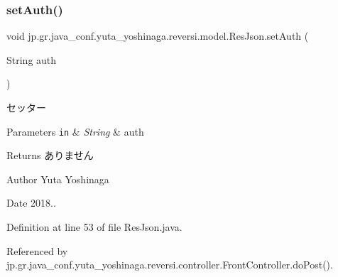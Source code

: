 \mbox{\label{classjp_1_1gr_1_1java__conf_1_1yuta__yoshinaga_1_1reversi_1_1model_1_1_res_json_aec94a5246bf7245af19f8f72100e986c}} 
\subsubsection{\texorpdfstring{set\+Auth()}{setAuth()}}
{\footnotesize\ttfamily void jp.\+gr.\+java\+\_\+conf.\+yuta\+\_\+yoshinaga.\+reversi.\+model.\+Res\+Json.\+set\+Auth (\begin{DoxyParamCaption}\item[{String}]{auth }\end{DoxyParamCaption})}



セッター 


\begin{DoxyParams}[1]{Parameters}
\mbox{\tt in}  & {\em String} & auth \\
\hline
\end{DoxyParams}
\begin{DoxyReturn}{Returns}
ありません 
\end{DoxyReturn}
\begin{DoxyAuthor}{Author}
Yuta Yoshinaga 
\end{DoxyAuthor}
\begin{DoxyDate}{Date}
2018.. 
\end{DoxyDate}


Definition at line 53 of file Res\+Json.\+java.



Referenced by jp.\+gr.\+java\+\_\+conf.\+yuta\+\_\+yoshinaga.\+reversi.\+controller.\+Front\+Controller.\+do\+Post().

